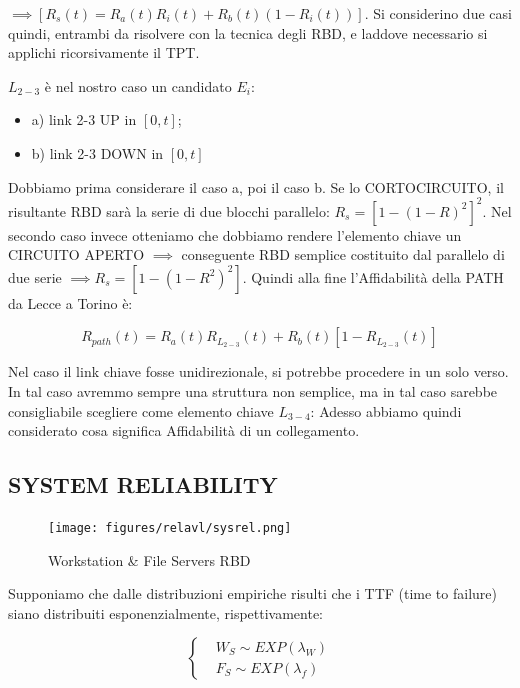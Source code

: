 $\implies [R_s(t) = R_a(t)R_i(t) + R_b(t)(1-R_i(t))]$. Si considerino due casi quindi, entrambi da risolvere con la tecnica degli RBD, e laddove necessario si applichi ricorsivamente il TPT.

$L_{2-3}$ è nel nostro caso un candidato $E_i$:

\begin{itemize}

\item{a)} link 2-3 UP in $[0,t]$;
\item{b)} link 2-3 DOWN in $[0,t]$
\end{itemize}

Dobbiamo prima considerare il caso a, poi il caso b. Se lo CORTOCIRCUITO, il risultante RBD sarà la serie di due blocchi parallelo: $R_s = [1-(1-R)^2]^2$. Nel secondo caso invece otteniamo che dobbiamo rendere l'elemento chiave un CIRCUITO APERTO $\implies$ conseguente RBD semplice costituito dal parallelo di due serie $\implies R_s = [1-(1-R^2)^2]$. Quindi alla fine l'Affidabilità della PATH da Lecce a Torino è:

\[
	R_{path}(t) = R_a(t)R_{L_{2-3}}(t) + R_b(t)[1-R_{L_{2-3}}(t)]
\]

Nel caso il link chiave fosse unidirezionale, si potrebbe procedere in un solo verso. In tal caso avremmo sempre una struttura non semplice, ma in tal caso sarebbe consigliabile scegliere come elemento chiave $L_{3-4}$:
Adesso abbiamo quindi considerato cosa significa Affidabilità di un collegamento.

\subsection{SYSTEM RELIABILITY}

\begin{center}
\begin{figure}[H]
\centering
\texttt{[image: figures/relavl/sysrel.png]}
\caption{Workstation \& File Servers RBD}
\end{figure}
\end{center}

Supponiamo che dalle distribuzioni empiriche risulti che i TTF (time to failure) siano distribuiti esponenzialmente, rispettivamente:

\[
	\left\{
	\begin{aligned}
	&W_S \sim EXP(\lambda_W)\\
	&F_S \sim EXP(\lambda_f)
	\end{aligned}
	\right.
\]

